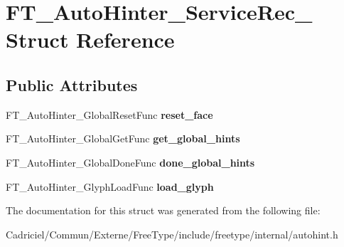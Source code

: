 \hypertarget{struct_f_t___auto_hinter___service_rec__}{\section{F\-T\-\_\-\-Auto\-Hinter\-\_\-\-Service\-Rec\-\_\- Struct Reference}
\label{struct_f_t___auto_hinter___service_rec__}
}
\subsection*{Public Attributes}
\begin{DoxyCompactItemize}
\item 
\hypertarget{struct_f_t___auto_hinter___service_rec___a846234a9c9c5427d3274e4568f33272c}{F\-T\-\_\-\-Auto\-Hinter\-\_\-\-Global\-Reset\-Func {\bfseries reset\-\_\-face}}\label{struct_f_t___auto_hinter___service_rec___a846234a9c9c5427d3274e4568f33272c}

\item 
\hypertarget{struct_f_t___auto_hinter___service_rec___a958371c33e08125393cd4b401a22f2a0}{F\-T\-\_\-\-Auto\-Hinter\-\_\-\-Global\-Get\-Func {\bfseries get\-\_\-global\-\_\-hints}}\label{struct_f_t___auto_hinter___service_rec___a958371c33e08125393cd4b401a22f2a0}

\item 
\hypertarget{struct_f_t___auto_hinter___service_rec___a648ac943fc1194f60ba638e0a59486e9}{F\-T\-\_\-\-Auto\-Hinter\-\_\-\-Global\-Done\-Func {\bfseries done\-\_\-global\-\_\-hints}}\label{struct_f_t___auto_hinter___service_rec___a648ac943fc1194f60ba638e0a59486e9}

\item 
\hypertarget{struct_f_t___auto_hinter___service_rec___ad36efe39469959626744ebdd04a04031}{F\-T\-\_\-\-Auto\-Hinter\-\_\-\-Glyph\-Load\-Func {\bfseries load\-\_\-glyph}}\label{struct_f_t___auto_hinter___service_rec___ad36efe39469959626744ebdd04a04031}

\end{DoxyCompactItemize}


The documentation for this struct was generated from the following file\-:\begin{DoxyCompactItemize}
\item 
Cadriciel/\-Commun/\-Externe/\-Free\-Type/include/freetype/internal/autohint.\-h\end{DoxyCompactItemize}
